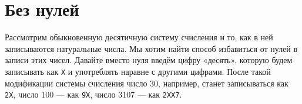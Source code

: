 \section{Без нулей}

\vspace{-0.2cm} 

\ms Рассмотрим обыкновенную десятичную систему счисления и то, как в ней записываются натуральные числа. Мы хотим найти способ избавиться от нулей в записи этих чисел. Давайте вместо нуля введём цифру «десять», которую будем записывать как {\tt X} и употреблять наравне с другими цифрами. После такой модификации системы счисления число 30, например, станет записываться как {\tt 2X}, число 100 — как {\tt 9X}, число 3107 — как {\tt 2XX7}.

